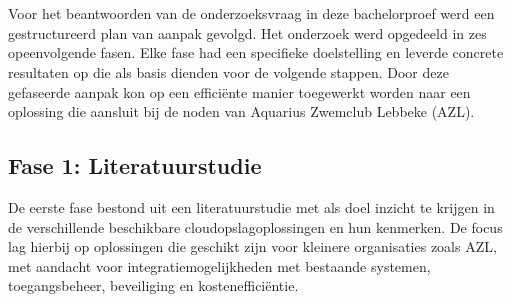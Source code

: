 
\chapter{}%
\label{ch:methodologie}


Voor het beantwoorden van de onderzoeksvraag in deze bachelorproef werd een gestructureerd plan van aanpak gevolgd. 
Het onderzoek werd opgedeeld in zes opeenvolgende fasen. 
Elke fase had een specifieke doelstelling en leverde concrete resultaten op die als basis dienden voor de volgende stappen. 
Door deze gefaseerde aanpak kon op een efficiënte 
manier toegewerkt worden naar een oplossing die aansluit bij de noden van Aquarius Zwemclub Lebbeke (AZL).

\section{Fase 1: Literatuurstudie}
De eerste fase bestond uit een literatuurstudie met als doel inzicht te krijgen in de verschillende beschikbare cloudopslagoplossingen en hun kenmerken. 
De focus lag hierbij op oplossingen die geschikt zijn voor kleinere organisaties zoals AZL, met aandacht voor integratiemogelijkheden met bestaande systemen, 
toegangsbeheer, beveiliging en kostenefficiëntie.

